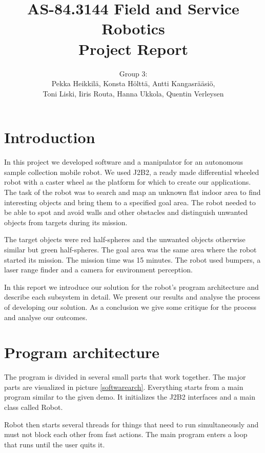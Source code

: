 \documentclass[a4paper,10pt]{article}
\begin{document}
\title{AS-84.3144 Field and Service Robotics\\Project Report}
\author{Group 3:\\Pekka Heikkilä, Konsta Hölttä, Antti Kangasrääsiö,\\Toni Liski, Iiris Routa, Hanna Ukkola, Quentin Verleysen}

\maketitle
\thispagestyle{empty}
\newpage
\tableofcontents
\newpage
\section{Introduction}

In this project we developed software and a manipulator for an autonomous sample collection mobile robot. We used J2B2, a ready made differential wheeled robot with a caster wheel as the platform for which to create our applications. The task of the robot was to search and map an unknown flat indoor area to find interesting objects and bring them to a specified goal area. The robot needed to be able to spot and avoid walls and other obstacles and distinguish unwanted objects from targets during its mission.

The target objects were red half-spheres and the unwanted objects otherwise similar but green half-spheres. The goal area was the same area where the robot started its mission. The mission time was 15 minutes. The robot used bumpers, a laser range finder and a camera for environment perception.

In this report we introduce our solution for the robot's program architecture and describe each subsystem in detail. We present our results and analyse the process of developing our solution. As a conclusion we give some critique for the process and analyse our outcomes.

\section{Program architecture}

The program is divided in several small parts that work together. The major parts are visualized in picture \ref{softwarearch}. Everything starts from a main program similar to the given demo. It initializes the J2B2 interfaces and a main class called Robot.

Robot then starts several threads for things that need to run simultaneously and must not block each other from fast actions. The main program enters a loop that runs until the user quits it.
\end{document}
